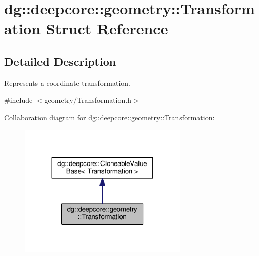 \hypertarget{structdg_1_1deepcore_1_1geometry_1_1_transformation}{}\section{dg\+:\+:deepcore\+:\+:geometry\+:\+:Transformation Struct Reference}
\label{structdg_1_1deepcore_1_1geometry_1_1_transformation}


\subsection{Detailed Description}
Represents a coordinate transformation. 

{\ttfamily \#include $<$geometry/\+Transformation.\+h$>$}



Collaboration diagram for dg\+:\+:deepcore\+:\+:geometry\+:\+:Transformation\+:
\nopagebreak
\begin{figure}[H]
\begin{center}
\leavevmode
\includegraphics[width=227pt]{structdg_1_1deepcore_1_1geometry_1_1_transformation__coll__graph}
\end{center}
\end{figure}
